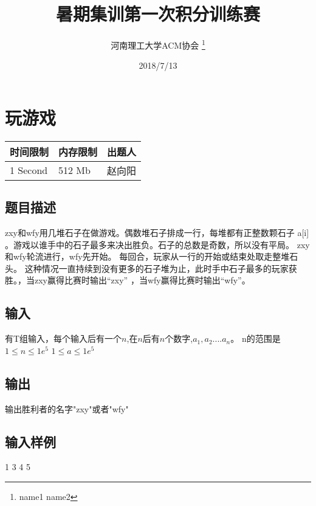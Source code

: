 \documentclass[12pt, a4paper]{article}
\title{暑期集训第一次积分训练赛}
\author{河南理工大学ACM协会 \thanks{name1 name2}}
\date{2018/7/13}
\begin{document}
\maketitle\newpage


\section{玩游戏}

\begin{table}[!h]
  \centering
  \begin{tabular}{l|l|l}
  时间限制 & 内存限制 & 出题人 \\
  \hline
  1 Second & 512 Mb & 赵向阳 \\
\end{tabular}
\end{table}

\subsection*{题目描述}

zxy和wfy用几堆石子在做游戏。偶数堆石子排成一行，每堆都有正整数颗石子 a[i] 。游戏以谁手中的石子最多来决出胜负。石子的总数是奇数，所以没有平局。\newline
zxy和wfy轮流进行，wfy先开始。 每回合，玩家从一行的开始或结束处取走整堆石头。 这种情况一直持续到没有更多的石子堆为止，此时手中石子最多的玩家获胜。，当zxy赢得比赛时输出“zxy” ，当wfy赢得比赛时输出“wfy”。
\subsection*{输入}
有T组输入，每个输入后有一个$n$,在$n$后有$n$个数字,$a_1,a_2....a_{n}$。
\newline
n的范围是$1\leq n\leq1e^5$
\newline
$1\leq a\leq1e^5$ 

\subsection*{输出}

输出胜利者的名字"zxy"或者"wfy"

\subsection*{输入样例}
1 3 4 5\newline
\end{document}
